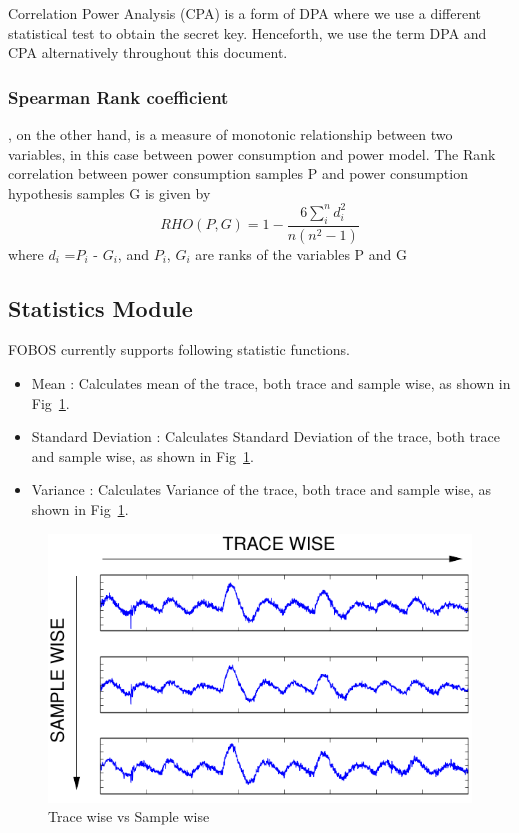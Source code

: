 \documentclass{llncs}
\numberwithin{algorithm}{chapter}
\begin{document}
Correlation Power Analysis (CPA) is a form of DPA where we use a different statistical test to obtain the secret key. Henceforth, we use
the term DPA and CPA alternatively throughout this document.

\subsubsection{Spearman Rank coefficient}, on the other hand, is a measure of monotonic relationship 
between two variables, in this case between power consumption and power model.
The Rank correlation between power consumption samples P and power consumption hypothesis samples G is given by
\begin{equation}
\label{pceqn}
RHO(P,G)=1-\frac{6\sum_{i}^{n}d_i^2}{n(n^2-1)}
\end{equation} 
where $d_i$ =$P_i$ - $G_i$, and $P_i$, $G_i$ are ranks of the variables P and G 

\subsection{Statistics Module}
FOBOS currently supports following statistic functions.
\begin{itemize}
\item Mean : Calculates mean of the trace, both trace and sample wise, as shown in Fig~\ref{fig:tvs}.
\item Standard Deviation : Calculates Standard Deviation of the trace, both trace and sample wise, as shown in Fig~\ref{fig:tvs}.
\item Variance : Calculates Variance of the trace, both trace and sample wise, as shown in Fig~\ref{fig:tvs}.
\end{itemize}

\begin{figure}[ht]
\begin{center}
\includegraphics[scale=0.6]{figures/sampleVstrace}
\caption{\label{fig:tvs}Trace wise vs Sample wise}
\end{center} 
\vspace{-3ex}
\end{figure}
\end{document}
